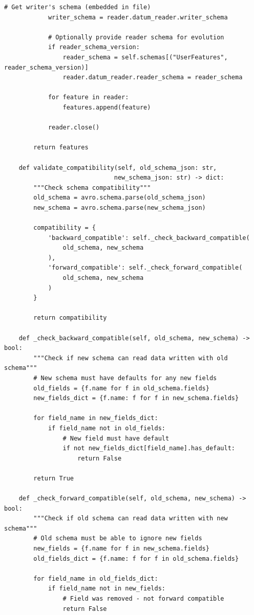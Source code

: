 \begin{lstlisting}[style=python, caption=Schema evolution with Apache Avro]
            # Get writer's schema (embedded in file)
            writer_schema = reader.datum_reader.writer_schema

            # Optionally provide reader schema for evolution
            if reader_schema_version:
                reader_schema = self.schemas[("UserFeatures", reader_schema_version)]
                reader.datum_reader.reader_schema = reader_schema

            for feature in reader:
                features.append(feature)

            reader.close()

        return features

    def validate_compatibility(self, old_schema_json: str,
                              new_schema_json: str) -> dict:
        """Check schema compatibility"""
        old_schema = avro.schema.parse(old_schema_json)
        new_schema = avro.schema.parse(new_schema_json)

        compatibility = {
            'backward_compatible': self._check_backward_compatible(
                old_schema, new_schema
            ),
            'forward_compatible': self._check_forward_compatible(
                old_schema, new_schema
            )
        }

        return compatibility

    def _check_backward_compatible(self, old_schema, new_schema) -> bool:
        """Check if new schema can read data written with old schema"""
        # New schema must have defaults for any new fields
        old_fields = {f.name for f in old_schema.fields}
        new_fields_dict = {f.name: f for f in new_schema.fields}

        for field_name in new_fields_dict:
            if field_name not in old_fields:
                # New field must have default
                if not new_fields_dict[field_name].has_default:
                    return False

        return True

    def _check_forward_compatible(self, old_schema, new_schema) -> bool:
        """Check if old schema can read data written with new schema"""
        # Old schema must be able to ignore new fields
        new_fields = {f.name for f in new_schema.fields}
        old_fields_dict = {f.name: f for f in old_schema.fields}

        for field_name in old_fields_dict:
            if field_name not in new_fields:
                # Field was removed - not forward compatible
                return False


\end{lstlisting}
